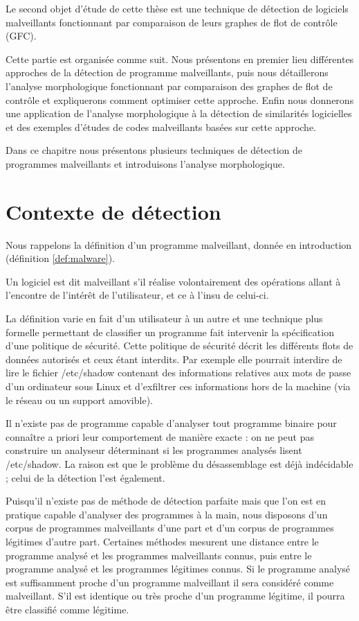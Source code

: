 Le second objet d'étude de cette thèse est une technique de détection de logiciels malveillants fonctionnant par comparaison de leurs graphes de flot de contrôle (GFC).

Cette partie est organisée comme suit.
Nous présentons en premier lieu différentes approches de la détection de programme malveillants, puis nous détaillerons l'analyse morphologique fonctionnant par comparaison des graphes de flot de contrôle et expliquerons comment optimiser cette approche. Enfin nous donnerons une application de l'analyse morphologique à la détection de similarités logicielles et des exemples d'études de codes malveillants basées sur cette approche.

Dans ce chapitre nous présentons plusieurs techniques de détection de programmes malveillants et introduisons l'analyse morphologique.

\section{Contexte de détection}
Nous rappelons la définition d'un programme malveillant, donnée en introduction (définition \ref{def:malware}).

\begin{defi}
Un logiciel est dit malveillant s'il réalise volontairement des opérations allant à l'encontre de l'intérêt de l'utilisateur, et ce à l'insu de celui-ci.
\label{def:malware}
\end{defi}

La définition varie en fait d'un utilisateur à un autre et une technique plus formelle permettant de classifier un programme fait intervenir la spécification d'une politique de sécurité. 
Cette politique de sécurité décrit les différents flots de données autorisés et ceux étant interdits. Par exemple elle pourrait interdire de lire le fichier /etc/shadow contenant des informations relatives aux mots de passe d'un ordinateur sous Linux et d'exfiltrer ces informations hors de la machine (via le réseau ou un support amovible).

Il n'existe pas de programme capable d'analyser tout programme binaire pour connaître a priori leur comportement de manière exacte : on ne peut pas construire un analyseur déterminant si les programmes analysés lisent /etc/shadow.
La raison est que le problème du désassemblage est déjà indécidable ; celui de la détection l'est également.

Puisqu'il n'existe pas de méthode de détection parfaite mais que l'on est en pratique capable d'analyser des programmes à la main, nous disposons d'un corpus de programmes malveillants d'une part et d'un corpus de programmes légitimes d'autre part.
Certaines méthodes mesurent une distance entre le programme analysé et les programmes malveillants connus, puis entre le programme analysé et les programmes légitimes connus. Si le programme analysé est suffisamment proche d'un programme malveillant il sera considéré comme malveillant. S'il est identique ou très proche d'un programme légitime, il pourra être classifié comme légitime.

